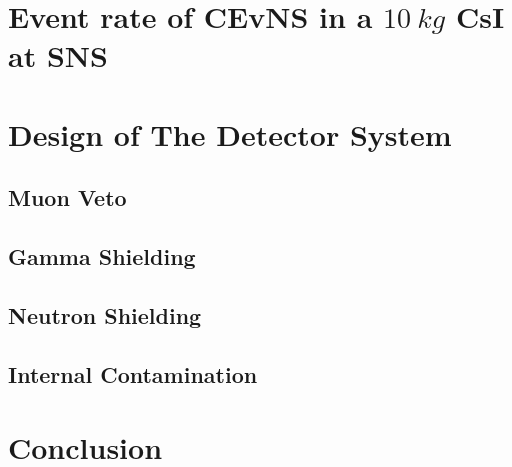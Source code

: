\documentclass[journal,transmag,onecolumn]{IEEEtran}
\begin{document}
\section{Event rate of CEvNS in a $10~kg$ CsI at SNS}

\section{Design of The Detector System}
\subsection{Muon Veto}


\subsection{Gamma Shielding}

\subsection{Neutron Shielding}

\subsection{Internal Contamination}

\section{Conclusion}

\end{document}
